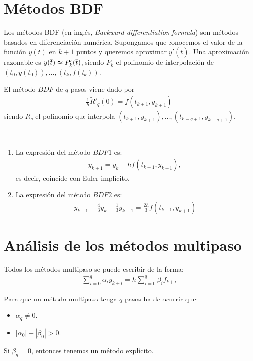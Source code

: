 \section{Métodos BDF}
Los métodos BDF (en inglés, \textit{Backward differentiation formula}) son métodos basados en diferenciación numérica. Supongamos que conocemos el valor de la función $y(t)$ en $k+1$ puntos y queremos aproximar $y'(\overline{t})$. Una aproximación razonable es $y(\overline{t}) \thickapprox P_k'(\overline{t})$, siendo $P_k$ el polinomio de interpolación de $(t_0,y(t_0)),\ldots,(t_k,f(t_k))$.

El método $BDF$ de $q$ pasos viene dado por
\begin{align*}
    \frac{1}{h} \widetilde{R}'_q(0) = f(t_{k+1},y_{k+1})
\end{align*}
siendo $R_q$ el polinomio que interpola $(t_{k+1},y_{k+1}),\ldots,(t_{k-q+1},y_{k-q+1})$.

\begin{ejemplo} \
    \begin{enumerate}
        \item La expresión del método $BDF1$ es:
              \begin{align*}
                  y_{k+1} = y_k + hf(t_{k+1},y_{k+1}),
              \end{align*}
              es decir, coincide con Euler implícito.
        \item La expresión del método $BDF2$ es:
              \begin{align*}
                  y_{k+1} -\frac{4}{3}y_k + \frac{1}{3}y_{k-1} = \frac{2h}{3}f(t_{k+1},y_{k+1})
              \end{align*}
    \end{enumerate}
\end{ejemplo}

\section{Análisis de los métodos multipaso}

Todos los métodos multipaso se puede escribir de la forma:
\begin{align*}
    \sum_{i=0}^{q} \alpha_i y_{k+i} = h\sum_{i=0}^{q} \beta_i f_{k+i}
\end{align*}

\begin{obs}
    Para que un método multipaso tenga $q$ pasos ha de ocurrir que:
    \begin{itemize}
        \item $\alpha_q \not = 0$.
        \item $|\alpha_0| + |\beta_0| > 0$.
    \end{itemize}
    Si $\beta_q = 0$, entonces tenemos un método explícito.
\end{obs}

